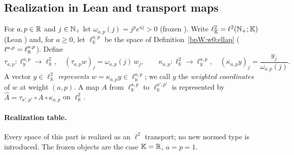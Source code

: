 \subsection{Realization in Lean and transport maps}\label{bpW:w1:realization}

\begin{definition}\label{bpW:w1:transport}
For $a,p\in\mathbb{R}$ and $j\in\mathbb{N}_+$ let $\omega_{a,p}(j)=j^pe^{aj}>0$ (frozen ). Write
$\ell^2_{\mathbb K}=\ell^2(\mathbb{N}_+;\mathbb K)$ (Lean ) and, for $a\ge0$, let
$\ell^{a,p}_{\mathbb K}$ be the space of Definition~\ref{bpW:w0:ellap} ($\ell^{a,p}=\ell^{a,p}_{\mathbb{R}}$). Define
\[\tau_{a,p}:\ell^{a,p}_{\mathbb K}\to\ell^2_{\mathbb K},\quad (\tau_{a,p}w)_j=\omega_{a,p}(j)\,w_j,\qquad
\kappa_{a,p}:\ell^2_{\mathbb K}\to\ell^{a,p}_{\mathbb K},\quad (\kappa_{a,p}y)_j=\frac{y_j}{\omega_{a,p}(j)}.\]
A vector $y\in\ell^2_{\mathbb K}$ \emph{represents} $w=\kappa_{a,p}y\in\ell^{a,p}_{\mathbb K}$; we call $y$ the
\emph{weighted coordinates} of $w$ at weight $(a,p)$. A map $A$ from $\ell^{a,p}_{\mathbb K}$ to
$\ell^{a',p'}_{\mathbb K}$ is represented by $\hat A=\tau_{a',p'}\circ A\circ\kappa_{a,p}$ on $\ell^2_{\mathbb K}$.
\end{definition}

\paragraph{Realization table.} Every space of this part is realized as an $\ell^2$ transport; no new normed type is
introduced. The frozen objects are the case $\mathbb K=\mathbb{R}$, $a=p=1$.

